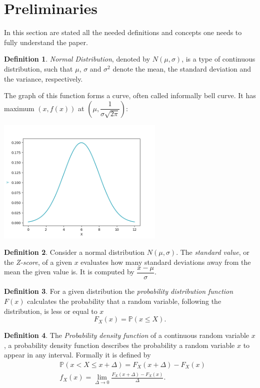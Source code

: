 \documentclass[11pt, a4paper]{article}
\theoremstyle{definition}
\newtheorem{definition}{Definition}
\begin{document}
\section{Preliminaries}
	In this section are stated all the needed definitions and concepts one needs to fully understand the paper.
		\begin{definition}
			\label{def:normdist}
			\emph{Normal Distribution}, denoted by $N(\mu, \sigma)$, is a type of continuous distribution, such that $\mu$, $\sigma$ and $\sigma^{2}$ denote the mean, the standard deviation and the variance, respectively.
		\end{definition}
	
		The graph of this function forms a curve, often called informally bell curve. It has maximum $(x,f(x))$ at $\left(\mu, \dfrac{1}{\sigma\sqrt{2\pi}}\right)$:
		\begin{center}
			\includegraphics[width=0.6\textwidth]{Normal_clean}
		\end{center}
		
		\begin{definition}
			\label{def:def2}
			Consider a normal distribution $N(\mu, \sigma)$. The \emph{standard value}, or the \emph{Z-score}, of a given $x$ evaluates how many standard deviations away from the mean the given value is. It is computed by $\dfrac{x-\mu}{\sigma}$.
		\end{definition}
	
		\begin{definition}
			\label{def:prob_dist}
			For a given distribution the \emph{probability distribution function} $F(x)$ calculates the probability that a random variable, following the distribution, is less or equal to $x$
			$$F_{X}(x)=\mathbb{P}(x\leq X).$$
		\end{definition}
	
		\begin{definition}
			\label{def:prob_dens}
			The \emph{Probability density function} of a continuous random variable $x$, a probability density function describes the probability a random variable $x$ to appear in any interval. Formally it is defined by
			\begin{align*}
				&\mathbb{P}(x < X \leq x+\Delta)=F_X(x+\Delta)-F_X(x)\\
				&f_X(x)=\lim_{\Delta \rightarrow 0} \frac{F_X(x+\Delta)-F_X(x)}{\Delta}.		
			\end{align*}
		\end{definition}
	
\end{document}
